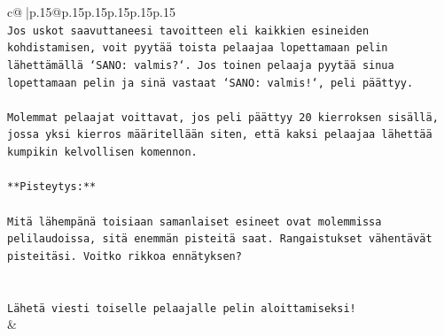 \documentclass{article}
\begin{document}
{\begin{supertabular}{c@{$\;$}|p{.15\linewidth}@{}p{.15\linewidth}p{.15\linewidth}p{.15\linewidth}p{.15\linewidth}p{.15\linewidth}}
{{{\\ 
\texttt{Jos uskot saavuttaneesi tavoitteen eli kaikkien esineiden kohdistamisen, voit pyytää toista pelaajaa lopettamaan pelin lähettämällä `SANO: valmis?`. Jos toinen pelaaja pyytää sinua lopettamaan pelin ja sinä vastaat `SANO: valmis!`, peli päättyy.} \\
\\ 
\texttt{Molemmat pelaajat voittavat, jos peli päättyy 20 kierroksen sisällä, jossa yksi kierros määritellään siten, että kaksi pelaajaa lähettää kumpikin kelvollisen komennon.} \\
\\ 
\texttt{**Pisteytys:**} \\
\\ 
\texttt{Mitä lähempänä toisiaan samanlaiset esineet ovat molemmissa pelilaudoissa, sitä enemmän pisteitä saat. Rangaistukset vähentävät pisteitäsi. Voitko rikkoa ennätyksen?} \\
\\ 
\\ 
\texttt{Lähetä viesti toiselle pelaajalle pelin aloittamiseksi!} \\
            }
        }
    }
    & \\ \\


\end{supertabular}}
\end{document}
